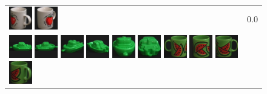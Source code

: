 \begin{figure}[bp]
\begin{tabular}{m{11cm} | m{3cm} |}
\includegraphics[width=1cm]{coil/beeld-40.eps}
\includegraphics[width=1cm]{coil/beeld-39.eps}
& {\scriptsize 0.0}
\\
\includegraphics[width=1cm]{coil/beeld-54.eps}
\includegraphics[width=1cm]{coil/beeld-55.eps}
\includegraphics[width=1cm]{coil/beeld-57.eps}
\includegraphics[width=1cm]{coil/beeld-58.eps}
\includegraphics[width=1cm]{coil/beeld-56.eps}
\includegraphics[width=1cm]{coil/beeld-59.eps}
\includegraphics[width=1cm]{coil/beeld-31.eps}
\includegraphics[width=1cm]{coil/beeld-32.eps}
\includegraphics[width=1cm]{coil/beeld-30.eps}
\includegraphics[width=1cm]{coil/beeld-34.eps}

\end{tabular}
\end{figure}
